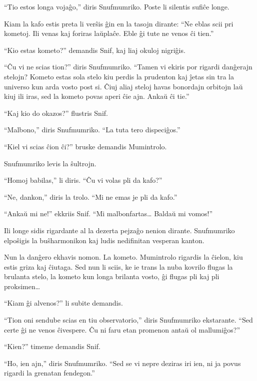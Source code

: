 ``Tio estos longa vojaĝo,'' diris Snufmumriko. Poste li silentis sufiĉe longe.

Kiam la kafo estis preta li verŝis ĝin en la tasojn dirante: ``Ne eblas scii pri kometoj. Ili venas kaj foriras laŭplaĉe. Eble ĝi tute ne venos ĉi tien.''

``Kio estas kometo?'' demandis Snif, kaj liaj okuloj nigriĝis.

``Ĉu vi ne scias tion?'' diris Snufmumriko. ``Tamen vi ekiris por rigardi danĝerajn stelojn? Kometo estas sola stelo kiu perdis la prudenton kaj ĵetas sin tra la universo kun arda vosto post si. Ĉiuj aliaj steloj havas bonordajn orbitojn laŭ kiuj ili iras, sed la kometo povas aperi ĉie ajn. Ankaŭ ĉi tie.''

``Kaj kio do okazos?'' flustris Snif.

``Malbono,'' diris Snufmumriko. ``La tuta tero dispeciĝos.''

``Kiel vi scias ĉion ĉi?'' bruske demandis Mumintrolo.

Snufmumriko levis la ŝultrojn.

``Homoj babilas,'' li diris. ``Ĉu vi volas pli da kafo?''

``Ne, dankon,'' diris la trolo. ``Mi ne emas je pli da kafo.''

``Ankaŭ mi ne!'' ekkriis Snif. ``Mi malbonfartas{\ldots} Baldaŭ mi vomos!''

Ili longe sidis rigardante al la dezerta pejzaĝo nenion dirante. Snufmumriko elpoŝigis la buŝharmonikon kaj ludis nedifinitan vesperan kanton.

Nun la danĝero ekhavis nomon. La kometo. Mumintrolo rigardis la ĉielon, kiu estis griza kaj ĉiutaga. Sed nun li sciis, ke ie trans la nuba kovrilo flugas la brulanta stelo, la kometo kun longa brilanta vosto, ĝi flugas pli kaj pli proksimen{\ldots}

``Kiam ĝi alvenos?'' li subite demandis.

``Tion oni sendube scias en tiu observatorio,'' diris Snufmumriko ekstarante. ``Sed certe ĝi ne venos ĉivespere. Ĉu ni faru etan promenon antaŭ ol mallumiĝos?''

``Kien?'' timeme demandis Snif.

``Ho, ien ajn,'' diris Snufmumriko. ``Sed se vi nepre deziras iri ien, ni ja povus rigardi la grenatan fendegon.''


